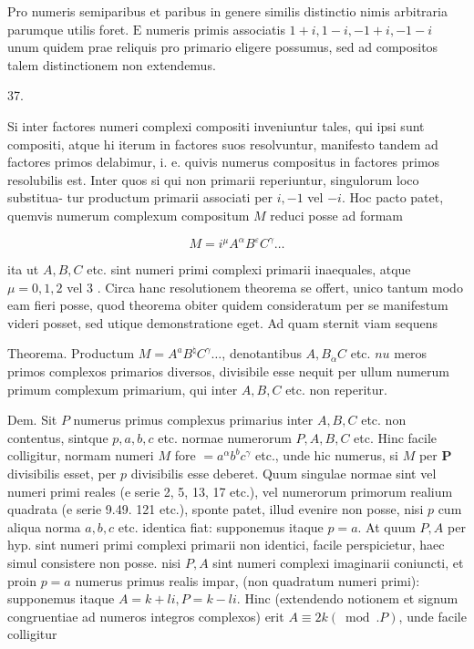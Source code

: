 \documentclass[10pt]{article}
\begin{document}
Pro numeris semiparibus et paribus in genere similis distinctio nimis arbitraria parumque utilis foret. \(\mathrm{E}\) numeris primis associatis \(1+i, 1-i,-1+i,-1-i\) unum quidem prae reliquis pro primario eligere possumus, sed ad compositos talem distinctionem non extendemus.

37.

Si inter factores numeri complexi compositi inveniuntur tales, qui ipsi sunt compositi, atque hi iterum in factores suos resolvuntur, manifesto tandem ad factores primos delabimur, i. e. quivis numerus compositus in factores primos resolubilis est. Inter quos si qui non primarii reperiuntur, singulorum loco substitua-
tur productum primarii associati per \(i,-1\) vel \(-i\). Hoc pacto patet, quemvis numerum complexum compositum \(M\) reduci posse ad formam

\[
M=i^{\mu} A^{\alpha} B^{\varepsilon} C^{\gamma} \ldots
\]

ita ut \(A, B, C\) etc. sint numeri primi complexi primarii inaequales, atque \(\mu=0,1,2\) vel 3 . Circa hanc resolutionem theorema se offert, unico tantum modo eam fieri posse, quod theorema obiter quidem consideratum per se manifestum videri posset, sed utique demonstratione eget. Ad quam sternit viam sequens

Theorema. Productum \(M=A^{a} B^{\natural} C^{\gamma} \ldots\), denotantibus \(A, B_{\dot{\alpha}} C\) etc. \(n u\) meros primos complexos primarios diversos, divisibile esse nequit per ullum numerum primum complexum primarium, qui inter \(A, B, C\) etc. non reperitur.

Dem. Sit \(P\) numerus primus complexus primarius inter \(A, B, C\) etc. non contentus, sintque \(p, a, b, c\) etc. normae numerorum \(P, A, B, C\) etc. Hinc facile colligitur, normam numeri \(M\) fore \(=a^{\alpha} b^{b} c^{\gamma}\) etc., unde hic numerus, si \(M\) per \(\boldsymbol{P}\) divisibilis esset, per \(p\) divisibilis esse deberet. Quum singulae normae sint vel numeri primi reales (e serie 2, 5, 13, 17 etc.), vel numerorum primorum realium quadrata (e serie 9.49. 121 etc.), sponte patet, illud evenire non posse, nisi \(p\) cum aliqua norma \(a, b, c\) etc. identica fiat: supponemus itaque \(p=a\). At quum \(P, A\) per hyp. sint numeri primi complexi primarii non identici, facile perspicietur, haec simul consistere non posse. nisi \(P, A\) sint numeri complexi imaginarii coniuncti, et proin \(p=a\) numerus primus realis impar, (non quadratum numeri primi): supponemus itaque \(A=k+l i, P=k-l i\). Hinc (extendendo notionem et signum congruentiae ad numeros integros complexos) erit \(A \equiv 2 k(\bmod . P)\), unde facile colligitur
\end{document}
